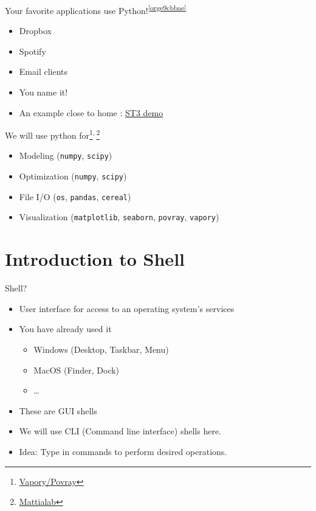 \documentclass[presentation]{beamer}
\begin{document}
\begin{frame}[label={sec:org805853b}]{Your favorite applications use Python!\textsuperscript{\ref{orge9cbbae}}}
\begin{itemize}
\item Dropbox
\item Spotify
\item Email clients
\item You name it!
\item An example close to home : \href{code/clangformat.cpp}{ST3 demo}
\end{itemize}
\end{frame}

\begin{frame}[label={sec:orgc037396},fragile]{We will use python for\footnote{\href{https://zulko.github.io/blog/2014/11/13/things-you-can-do-with-python-and-pov-ray/\#disqus\_thread}{Vapory/Povray}}\textsuperscript{,}\,\footnote{\href{http://mattia-lab.com/work/soft-filaments/}{Mattialab}}}
 \begin{itemize}
\item Modeling (\texttt{numpy}, \texttt{scipy})
\item Optimization (\texttt{numpy}, \texttt{scipy})
\item File I/O (\texttt{os}, \texttt{pandas}, \texttt{cereal})
\item Visualization (\texttt{matplotlib}, \texttt{seaborn}, \texttt{povray}, \texttt{vapory})
\end{itemize}
\end{frame}

\section{Introduction to Shell}
\label{sec:orgb20fde2}
\begin{frame}[label={sec:orge28cbb3}]{Shell?}
\begin{itemize}
\item User interface for access to an operating system's services
\item You have already used it
\begin{itemize}
\item Windows (Desktop, Taskbar, Menu)
\item MacOS (Finder, Dock)
\item \ldots{}
\end{itemize}
\item These are GUI shells
\item We will use CLI (Command line interface) shells here.
\item Idea: Type in commands to perform desired operations.
\end{itemize}
\end{frame}
\end{document}
